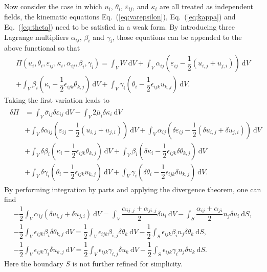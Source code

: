 \documentclass[3p,sort&compress,11pt,fleqn]{elsarticle}
\newcommand*{\eqsref}[1]{Eq.~(\ref{#1})}
\newcommand*{\md}[1]{\mathrm{d}#1}
\begin{document}
Now consider the case in which $u_i$, $\theta_i$, $\varepsilon_{ij}$, and $\kappa_i$ are all treated as independent fields, the kinematic equations \eqsref{eq:varepsilon}, \eqsref{eq:kappa} and \eqsref{eq:theta} need to be satisfied in a weak form. By introducing three Lagrange multipliers $\alpha_{ij}$, $\beta_i$ and $\gamma_i$, those equations can be appended to the above functional so that
\begin{multline}
\varPi\left(u_i,\theta_i,\varepsilon_{ij},\kappa_i,\alpha_{ij},\beta_i,\gamma_i\right)=\int_VW~\md{V}
+\int_V\alpha_{ij}\left(\varepsilon_{ij}-\dfrac{1}{2}\left(u_{i,j}+u_{j,i}\right)\right)~\md{V}\\
+\int_V\beta_i\left(\kappa_i-\dfrac{1}{2}\epsilon_{ijk}\theta_{k,j}\right)~\md{V}
+\int_V\gamma_i\left(\theta_i-\dfrac{1}{2}\epsilon_{ijk}u_{k,j}\right)~\md{V}.
\end{multline}
Taking the first variation leads to
\begin{gather}\label{eq:variation}
\begin{split}
\delta\varPi&=
\int_V\bar{\sigma}_{ij}\delta\varepsilon_{ij}~\md{V}
-\int_V2\bar{\mu}_{i}\delta\kappa_i~\md{V}\\&
+\int_V\delta{}\alpha_{ij}\left(\varepsilon_{ij}-\dfrac{1}{2}\left(u_{i,j}+u_{j,i}\right)\right)~\md{V}
+\int_V\alpha_{ij}\left(\delta{}\varepsilon_{ij}-\dfrac{1}{2}\left(\delta{}u_{i,j}+\delta{}u_{j,i}\right)\right)~\md{V}\\&
+\int_V\delta{}\beta_i\left(\kappa_i-\dfrac{1}{2}\epsilon_{ijk}\theta_{k,j}\right)~\md{V}
+\int_V\beta_i\left(\delta{}\kappa_i-\dfrac{1}{2}\epsilon_{ijk}\delta{}\theta_{k,j}\right)~\md{V}\\&
+\int_V\delta{}\gamma_i\left(\theta_i-\dfrac{1}{2}\epsilon_{ijk}u_{k,j}\right)~\md{V}
+\int_V\gamma_i\left(\delta{}\theta_i-\dfrac{1}{2}\epsilon_{ijk}\delta{}u_{k,j}\right)~\md{V}.
\end{split}
\end{gather}
By performing integration by parts and applying the divergence theorem, one can find
\begin{gather}
-\dfrac{1}{2}\int_V\alpha_{ij}\left(\delta{}u_{i,j}+\delta{}u_{j,i}\right)~\md{V}=\int_V\dfrac{\alpha_{ij,j}+\alpha_{ji,j}}{2}\delta{}u_i~\md{V}-\int_S\dfrac{\alpha_{ij}+\alpha_{ji}}{2}n_j\delta{}u_i~\md{S},\\
-\dfrac{1}{2}\int_V\epsilon_{ijk}\beta_i\delta\theta_{k,j}~\md{V}=\dfrac{1}{2}\int_V\epsilon_{ijk}\beta_{i,j}\delta\theta_k~\md{V}-\dfrac{1}{2}\int_S\epsilon_{ijk}\beta_in_j\delta\theta_k~\md{S},\\
-\dfrac{1}{2}\int_V\epsilon_{ijk}\gamma_i\delta{}u_{k,j}~\md{V}=\dfrac{1}{2}\int_V\epsilon_{ijk}\gamma_{i,j}\delta{}u_k~\md{V}-\dfrac{1}{2}\int_S\epsilon_{ijk}\gamma_in_j\delta{}u_k~\md{S}.
\end{gather}
Here the boundary $S$ is not further refined for simplicity.
\end{document}
